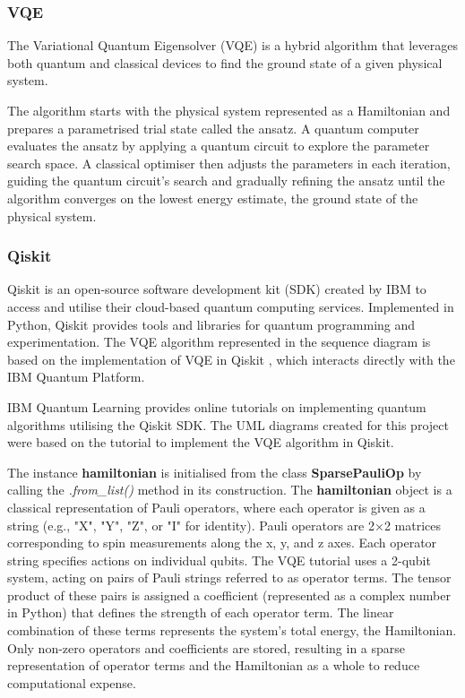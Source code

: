 \documentclass{article}
\newcounter{subsubsubsection}[subsubsection]
\begin{document}
\subsubsection{VQE}

The Variational Quantum Eigensolver (VQE) is a hybrid algorithm that leverages both quantum and classical devices to find the ground state of a given physical system. 

The algorithm starts with the physical system represented as a Hamiltonian and prepares a parametrised trial state called the ansatz. A quantum computer evaluates the ansatz by applying a quantum circuit to explore the parameter search space. A classical optimiser then adjusts the parameters in each iteration, guiding the quantum circuit’s search and gradually refining the ansatz until the algorithm converges on the lowest energy estimate, the ground state of the physical system.

\subsubsection{Qiskit}

Qiskit is an open-source software development kit (SDK) created by IBM to access and utilise their cloud-based quantum computing services. Implemented in Python, Qiskit provides tools and libraries for quantum programming and experimentation. The VQE algorithm represented in the sequence diagram is based on the implementation of VQE in Qiskit \cite{IBM2024}, which interacts directly with the IBM Quantum Platform.


IBM Quantum Learning provides online tutorials\cite{Tutorial} on implementing quantum algorithms utilising the Qiskit SDK. The UML diagrams created for this project were based on the tutorial to implement the VQE algorithm in Qiskit\cite{IBM2024}.

The instance \textbf{hamiltonian} is initialised from the class \textbf{SparsePauliOp} by calling the \textit{.from\_list()} method in its construction. The \textbf{hamiltonian} object is a classical representation of Pauli operators, where each operator is given as a string (e.g., "X", "Y", "Z", or "I" for identity). Pauli operators are 2×2 matrices corresponding to spin measurements along the x, y, and z axes\cite{DJORDJEVIC201229}. Each operator string specifies actions on individual qubits. The VQE tutorial uses a 2-qubit system, acting on pairs of Pauli strings referred to as operator terms. The tensor product of these pairs is assigned a coefficient (represented as a complex number in Python) that defines the strength of each operator term. The linear combination of these terms represents the system's total energy, the Hamiltonian. Only non-zero operators and coefficients are stored, resulting in a sparse representation of operator terms and the Hamiltonian as a whole to reduce computational expense.
\end{document}
